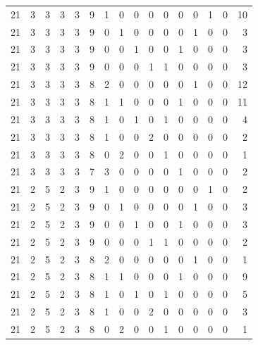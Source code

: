 \begin{appendix}
{\begin{longtable}{lrrrrrrrrrrrrrrr}
    21        & 3  & 3  & 3  & 3  & 9  & 1  & 0  & 0  & 0  & 0  & 0  & 0   & 1   & 0   & 10   \\
    21        & 3  & 3  & 3  & 3  & 9  & 0  & 1  & 0  & 0  & 0  & 0  & 1   & 0   & 0   & 3    \\
    21        & 3  & 3  & 3  & 3  & 9  & 0  & 0  & 1  & 0  & 0  & 1  & 0   & 0   & 0   & 3    \\
    21        & 3  & 3  & 3  & 3  & 9  & 0  & 0  & 0  & 1  & 1  & 0  & 0   & 0   & 0   & 3    \\
    21        & 3  & 3  & 3  & 3  & 8  & 2  & 0  & 0  & 0  & 0  & 0  & 1   & 0   & 0   & 12   \\
    21        & 3  & 3  & 3  & 3  & 8  & 1  & 1  & 0  & 0  & 0  & 1  & 0   & 0   & 0   & 11   \\
    21        & 3  & 3  & 3  & 3  & 8  & 1  & 0  & 1  & 0  & 1  & 0  & 0   & 0   & 0   & 4    \\
    21        & 3  & 3  & 3  & 3  & 8  & 1  & 0  & 0  & 2  & 0  & 0  & 0   & 0   & 0   & 2    \\
    21        & 3  & 3  & 3  & 3  & 8  & 0  & 2  & 0  & 0  & 1  & 0  & 0   & 0   & 0   & 1    \\
    21        & 3  & 3  & 3  & 3  & 7  & 3  & 0  & 0  & 0  & 0  & 1  & 0   & 0   & 0   & 2    \\
    21        & 2  & 5  & 2  & 3  & 9  & 1  & 0  & 0  & 0  & 0  & 0  & 0   & 1   & 0   & 2    \\
    21        & 2  & 5  & 2  & 3  & 9  & 0  & 1  & 0  & 0  & 0  & 0  & 1   & 0   & 0   & 3    \\
    21        & 2  & 5  & 2  & 3  & 9  & 0  & 0  & 1  & 0  & 0  & 1  & 0   & 0   & 0   & 3    \\
    21        & 2  & 5  & 2  & 3  & 9  & 0  & 0  & 0  & 1  & 1  & 0  & 0   & 0   & 0   & 2    \\
    21        & 2  & 5  & 2  & 3  & 8  & 2  & 0  & 0  & 0  & 0  & 0  & 1   & 0   & 0   & 1    \\
    21        & 2  & 5  & 2  & 3  & 8  & 1  & 1  & 0  & 0  & 0  & 1  & 0   & 0   & 0   & 9    \\
    21        & 2  & 5  & 2  & 3  & 8  & 1  & 0  & 1  & 0  & 1  & 0  & 0   & 0   & 0   & 5    \\
    21        & 2  & 5  & 2  & 3  & 8  & 1  & 0  & 0  & 2  & 0  & 0  & 0   & 0   & 0   & 3    \\
    21        & 2  & 5  & 2  & 3  & 8  & 0  & 2  & 0  & 0  & 1  & 0  & 0   & 0   & 0   & 1    \\

\end{longtable}}
\end{appendix}
